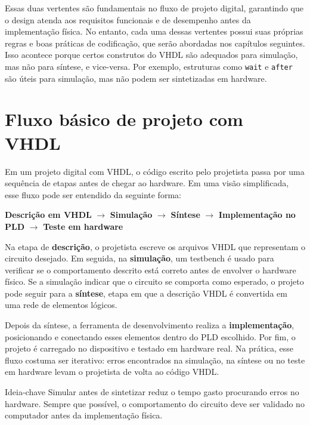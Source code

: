 Essas duas vertentes são fundamentais no fluxo de projeto digital, garantindo que o design atenda aos requisitos funcionais e de desempenho antes da implementação física. No entanto, cada uma dessas vertentes possui suas próprias regras e boas práticas de codificação, que serão abordadas nos capítulos seguintes. Isso acontece porque certos construtos do VHDL são adequados para simulação, mas não para síntese, e vice-versa. Por exemplo, estruturas como \texttt{wait} e \texttt{after} são úteis para simulação, mas não podem ser sintetizadas em hardware.

\section{Fluxo básico de projeto com VHDL}

Em um projeto digital com VHDL, o código escrito pelo projetista passa por uma sequência de etapas antes de chegar ao hardware. Em uma visão simplificada, esse fluxo pode ser entendido da seguinte forma:

\begin{center}
\textbf{Descrição em VHDL} $\rightarrow$ \textbf{Simulação} $\rightarrow$ \textbf{Síntese} $\rightarrow$ \textbf{Implementação no PLD} $\rightarrow$ \textbf{Teste em hardware}
\end{center}

Na etapa de \textbf{descrição}, o projetista escreve os arquivos VHDL que representam o circuito desejado. Em seguida, na \textbf{simulação}, um testbench é usado para verificar se o comportamento descrito está correto antes de envolver o hardware físico. Se a simulação indicar que o circuito se comporta como esperado, o projeto pode seguir para a \textbf{síntese}, etapa em que a descrição VHDL é convertida em uma rede de elementos lógicos.

Depois da síntese, a ferramenta de desenvolvimento realiza a \textbf{implementação}, posicionando e conectando esses elementos dentro do PLD escolhido. Por fim, o projeto é carregado no dispositivo e testado em hardware real. Na prática, esse fluxo costuma ser iterativo: erros encontrados na simulação, na síntese ou no teste em hardware levam o projetista de volta ao código VHDL.

\begin{observacao}{Ideia-chave}
Simular antes de sintetizar reduz o tempo gasto procurando erros no hardware. Sempre que possível, o comportamento do circuito deve ser validado no computador antes da implementação física.
\end{observacao}

